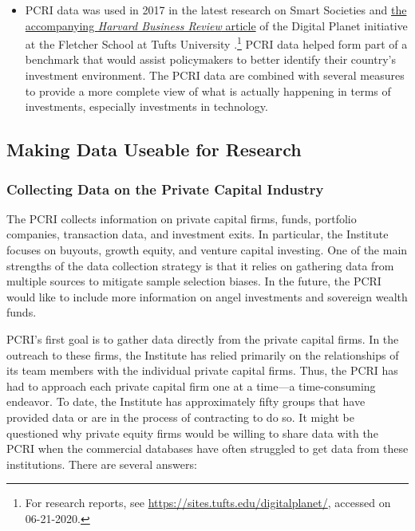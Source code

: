 \documentclass[
]{WileySix}
\begin{document}
\begin{itemize}
\item
  PCRI data was used in 2017 in the latest research on Smart Societies and \href{https://sites.tufts.edu/digitalplanet/hbr-the-smart-society-of-the-future-doesnt-look-like-science-fiction/}{the accompanying \emph{Harvard Business Review} article} of the Digital Planet initiative at the Fletcher School at Tufts University \citep{chakrovorti2017}.\footnote{For research reports, see \url{https://sites.tufts.edu/digitalplanet/}, accessed on 06-21-2020.} PCRI data helped form part of a benchmark that would assist policymakers to better identify their country's investment environment. The PCRI data are combined with several measures to provide a more complete view of what is actually happening in terms of investments, especially investments in technology.
\end{itemize}

\hypertarget{making-data-useable-for-research}{%
\subsection{Making Data Useable for Research}\label{making-data-useable-for-research}}

\hypertarget{collecting-data-on-the-private-capital-industry}{%
\subsubsection{Collecting Data on the Private Capital Industry}\label{collecting-data-on-the-private-capital-industry}}

The PCRI collects information on private capital firms, funds, portfolio companies, transaction data, and investment exits. In particular, the Institute focuses on buyouts, growth equity, and venture capital investing. One of the main strengths of the data collection strategy is that it relies on gathering data from multiple sources to mitigate sample selection biases. In the future, the PCRI would like to include more information on angel investments and sovereign wealth funds.

PCRI's first goal is to gather data directly from the private capital firms. In the outreach to these firms, the Institute has relied primarily on the relationships of its team members with the individual private capital firms. Thus, the PCRI has had to approach each private capital firm one at a time---a time-consuming endeavor. To date, the Institute has approximately fifty groups that have provided data or are in the process of contracting to do so. It might be questioned why private equity firms would be willing to share data with the PCRI when the commercial databases have often struggled to get data from these institutions. There are several answers:
\end{document}
